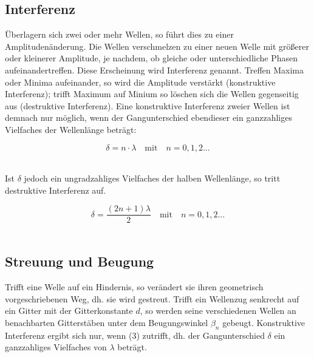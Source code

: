\documentclass[12pt,a4paper,titlepage,headinclude,bibtotoc]{scrartcl}
\begin{document}
\vspace{2 cm}

\subsection{Interferenz}
Überlagern sich zwei oder mehr Wellen, so führt dies zu einer Amplitudenänderung. Die Wellen verschmelzen zu einer neuen Welle mit größerer oder kleinerer Amplitude, je nachdem, ob gleiche oder unterschiedliche Phasen aufeinandertreffen. Diese Erscheinung wird Interferenz genannt. Treffen Maxima oder Minima aufeinander, so wird die Amplitude verstärkt (konstruktive Interferenz); trifft Maximum auf Minium so löschen sich die Wellen gegenseitig aus (destruktive Interferenz). 
Eine konstruktive Interferenz zweier Wellen ist demnach nur möglich, wenn der Gangunterschied ebendieser ein ganzzahliges Vielfaches der Wellenlänge beträgt:\\
\par
\begin{equation}
\delta={n}\cdot {\lambda} \quad \mathrm{mit}\quad n = 0,1,2...
\end{equation}
\\
\par

Ist $\delta$ jedoch ein ungradzahliges Vielfaches der halben Wellenlänge, so tritt destruktive Interferenz auf. \\
\par
\begin{equation}
\delta = \frac{(2n+1)\lambda}{2} \quad \mathrm{mit}\quad  n=0,1,2...
\end{equation}
\\
\par


\subsection{Streuung und Beugung}
Trifft eine Welle auf ein Hindernis, so verändert sie ihren geometrisch vorgeschriebenen Weg, dh. sie wird gestreut. %
Trifft ein Wellenzug senkrecht auf ein Gitter mit der Gitterkonstante $d$, so werden seine verschiedenen Wellen an benachbarten Gitterstäben unter dem Beugungswinkel $\beta_n$ gebeugt. Konstruktive Interferenz ergibt sich nur, wenn (3) zutrifft, dh. der Gangunterschied $\delta$ ein ganzzahliges Vielfaches von $\lambda$ beträgt.
\end{document}

